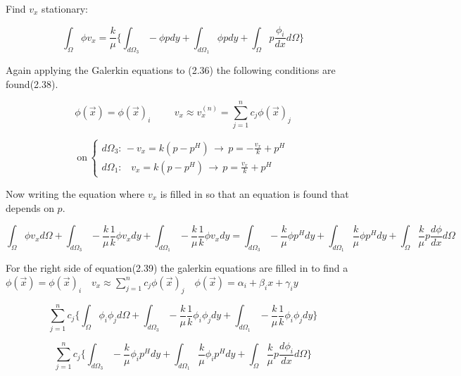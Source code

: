 \documentclass[a4paper]{report}
\begin{document}
Find $v_x$ stationary:

\begin{equation}
\int_{\Omega}\phi v_x = \frac{k}{\mu}\{\int_{d\Omega_3}-\phi pdy+\int_{d\Omega_1}\phi pdy+\int_{\Omega}p\frac{\phi_i}{dx}d\Omega\}
\end{equation}


Again applying the Galerkin equations to (2.36) the following conditions are found(2.38).

\begin{equation}
\phi(\vec{x})=\phi(\vec{x})_i \hspace{1cm}v_x\approx v^{(n)}_x = \sum_{j=1}^{n}c_j\phi(\vec{x})_j
\end{equation}


\begin{equation}
\text{on}\,
\begin{cases}
d\Omega_3:\, -v_x=k(p-p^H) \,\rightarrow\, p=-\frac{v_x}{k}+p^H\\
d\Omega_1:\,\,\,\,\, v_x=k(p-p^H) \,\rightarrow\, p=\frac{v_x}{k}+p^H
\end{cases}
\end{equation}

Now writing the equation where $v_x$ is filled in so that an equation is found that depends on $p$. 

\begin{equation}
	\int_{\Omega}\phi v_x d\Omega + \int_{d\Omega_3}-\frac{k}{\mu}\frac{1}{k}\phi v_xdy + \int_{d\Omega_1}-\frac{k}{\mu}\frac{1}{k}\phi v_x dy 
	= \int_{d\Omega_3}-\frac{k}{\mu}\phi p^H dy +\int_{d\Omega_1}\frac{k}{\mu}\phi p^H dy + \int_{\Omega}\frac{k}{\mu}p\frac{d\phi}{dx}d\Omega
\end{equation}

For the right side of equation(2.39) the galerkin equations are filled in to find a 
$\phi(\vec{x})=\phi(\vec{x})_i$\,\,\,\,  $v_x\approx \sum_{j=1}^{n}c_j\phi(\vec{x})_j$  \,\,\,\,$\phi(\vec{x})=\alpha_i+\beta_i x+\gamma_i y$

\begin{equation}
\sum_{j=1}^{n}c_j
\{\int_{\Omega}\phi_i\phi_j d\Omega +\int_{d\Omega_3}-\frac{k}{\mu}\frac{1}{k}\phi_i\phi_j dy + \int_{d\Omega_1}-\frac{k}{\mu}\frac{1}{k}\phi_i\phi_j dy \}
\end{equation}

\begin{equation}
\sum_{j=1}^{n}c_j
\{\int_{d\Omega_3}-\frac{k}{\mu}\phi_i p^H dy +\int_{d\Omega_1}\frac{k}{\mu}\phi_i p^H dy + \int_{\Omega}\frac{k}{\mu}p\frac{d\phi_i}{dx}d\Omega\}
\end{equation}
\end{document}
